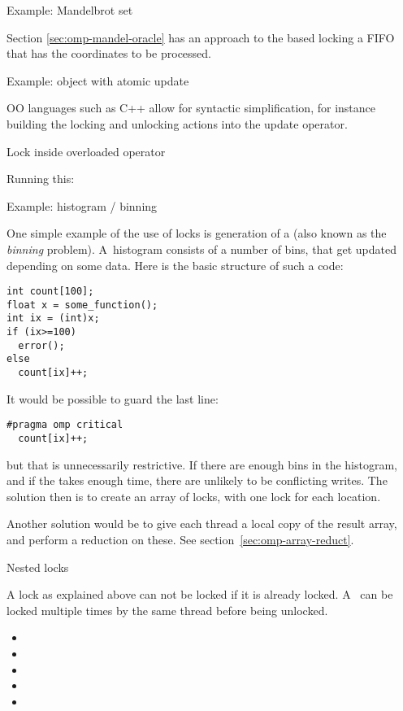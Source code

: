  {Example: Mandelbrot set}

Section \ref{sec:omp-mandel-oracle} has an approach to the  
based locking a FIFO that has the coordinates to be processed.

 {Example: object with atomic update}

\ac{OO} languages such as C++ allow for syntactic simplification,
for instance building the locking and unlocking actions into
the update operator.

\begin{cppnote}{Lock inside overloaded operator}
  \label{cpp:op-lock}

  Running this:

\end{cppnote}

 {Example: histogram / binning}

One simple example of the use of locks is generation of a 
(also known as the \emph{binning} problem).
A~histogram consists of a number of bins, that get updated depending on some data.
Here is the basic structure of such a code:
\begin{lstlisting}
int count[100];
float x = some_function();
int ix = (int)x;
if (ix>=100)
  error();
else
  count[ix]++;
\end{lstlisting}
It would be possible to guard the last line:
\begin{lstlisting}
#pragma omp critical
  count[ix]++;
\end{lstlisting}
but that is unnecessarily restrictive. If there are enough bins in the
histogram, and if the  takes enough time, there are unlikely to be
conflicting writes. The solution then is to create an array of locks, with
one lock for each  location.

Another solution would be to give each thread a local copy
of the result array, and perform a reduction on these.
See section~\ref{sec:omp-array-reduct}.

 {Nested locks}

A lock as explained above can not be locked if it is already locked.
A~ can be locked multiple times by the same
thread before being unlocked.

\begin{itemize}
\item {}
\item {}
\item {}
\item {}
\item {}
\end{itemize}

